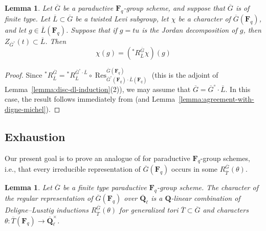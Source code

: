 \documentclass[reqno]{amsart}
\numberwithin{equation}{subsection}
\newcommand{\F}{\mathbf{F}}
\newcommand{\Q}{\mathbf{Q}}
\newcommand{\ol}[1]{\overline{#1}}
\newcommand{\co}{\colon}
\DeclareMathOperator{\Res}{Res}
\newtheorem{lemma}[thm]{Lemma}
\theoremstyle{remark}
\numberwithin{equation}{subsection}
\numberwithin{figure}{subsection}
\begin{document}
\begin{lemma}\label{lemma:dl-restriction-character}
    Let $\ol G$ be a paraductive $\F_q$-group scheme, and suppose that $\ol G$ is of finite type. Let $\ol L \subset \ol G$ be a twisted Levi subgroup, let $\chi$ be a character of $\ol G(\F_q)$, and let $g \in \ol L(\F_q)$. Suppose that if $g = tu$ is the Jordan decomposition of $g$, then $Z_{\ol G^\circ}(t) \subset \ol L$. Then
    \[
    \chi(g) = ({}^*R^{\ol G}_{\ol L}\chi)(g)
    \]
\end{lemma}

\begin{proof}
    Since ${}^*R^{\ol G}_{\ol L} = {}^*R^{\ol G^\circ \cdot \ol L}_{\ol L} \circ \Res^{\ol G(\F_q)}_{\ol G^\circ(\F_q) \cdot \ol L(\F_q)}$ (this is the adjoint of Lemma~\ref{lemma:disc-dl-induction}(2)), we may assume that $\ol G = \ol G^\circ \cdot \ol L$. In this case, the result follows immediately from \cite[Corollaire~2.9]{DM94} (and Lemma~\ref{lemma:agreement-with-digne-michel}).
\end{proof}




\subsection{Exhaustion}\label{sss:exhaustion}

Our present goal is to prove an analogue of \cite[Corollary~7.7]{DL76} for paraductive $\F_q$-group schemes, i.e., that every irreducible representation of $\ol G(\F_q)$ occurs in some $R_{\ol T}^{\ol G}(\theta)$.

\begin{lemma}\label{lemma:dl-7.5}
    Let $\ol G$ be a finite type paraductive $\F_q$-group scheme. The character of the regular representation of $\ol G(\F_q)$ over $\ol\Q_\ell$ is a $\Q$-linear combination of Deligne--Lusztig inductions $R_{\ol T}^{\ol G}(\theta)$ for generalized tori $\ol T \subset \ol G$ and characters $\theta\co \ol T(\F_q) \to \ol\Q_\ell^\times$.
\end{lemma}
\end{document}
